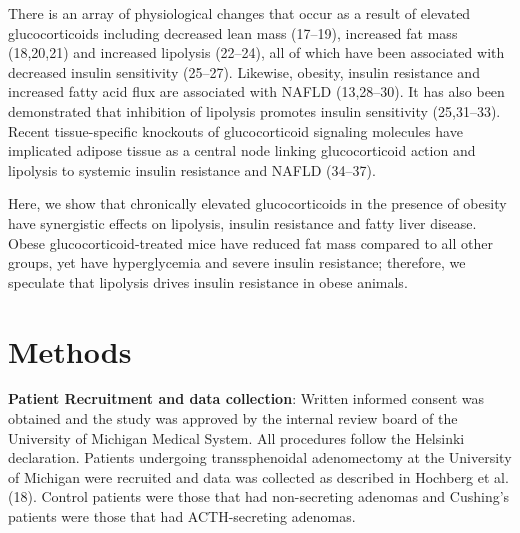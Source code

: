 \documentclass[11pt]{article} %
\begin{document}
There is an array of physiological changes that occur as a result of
elevated glucocorticoids including decreased lean mass (17--19),
increased fat mass (18,20,21) and increased lipolysis (22--24), all of
which have been associated with decreased insulin sensitivity (25--27).
Likewise, obesity, insulin resistance and increased fatty acid flux are
associated with NAFLD (13,28--30). It has also been demonstrated that
inhibition of lipolysis promotes insulin sensitivity (25,31--33). Recent
tissue-specific knockouts of glucocorticoid signaling molecules have
implicated adipose tissue as a central node linking glucocorticoid
action and lipolysis to systemic insulin resistance and NAFLD (34--37).

Here, we show that chronically elevated glucocorticoids in the presence
of obesity have synergistic effects on lipolysis, insulin resistance and
fatty liver disease. Obese glucocorticoid-treated mice have reduced fat
mass compared to all other groups, yet have hyperglycemia and severe
insulin resistance; therefore, we speculate that lipolysis drives
insulin resistance in obese animals.

\section*{Methods}

\textbf{Patient Recruitment and data collection}: Written informed
consent was obtained and the study was approved by the internal review
board of the University of Michigan Medical System. All procedures
follow the Helsinki declaration. Patients undergoing transsphenoidal
adenomectomy at the University of Michigan were recruited and data was
collected as described in Hochberg et al. (18). Control patients were
those that had non-secreting adenomas and Cushing's patients were those
that had ACTH-secreting adenomas.
\end{document}
